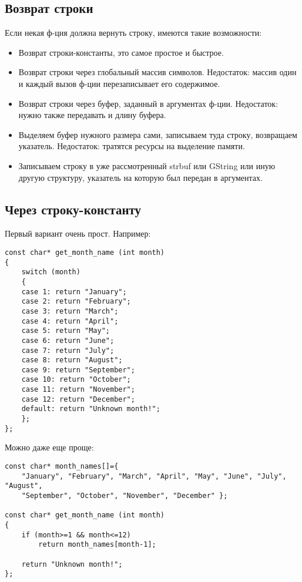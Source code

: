 ﻿\subsection{Возврат строки}

Если некая ф-ция должна вернуть строку, имеются такие возможности:

\begin{itemize}
\item
Возврат строки-константы, это самое простое и быстрое.

\item
Возврат строки через глобальный массив символов. Недостаток: массив один и каждый вызов ф-ции перезаписывает
его содержимое.

\item
Возврат строки через буфер, заданный в аргументах ф-ции. Недостаток: нужно также передавать и длину буфера.

\item
Выделяем буфер нужного размера сами, записываем туда строку, возвращаем указатель. Недостаток: тратятся ресурсы
на выделение памяти.

\item
Записываем строку в уже рассмотренный strbuf или GString или иную другую структуру, указатель на которую был
передан в аргументах.

\end{itemize}

\subsection{Через строку-константу}

Первый вариант очень прост. Например:

\begin{lstlisting}
const char* get_month_name (int month)
{
	switch (month)
	{
	case 1: return "January";
	case 2: return "February";
	case 3: return "March";
	case 4: return "April";
	case 5: return "May";
	case 6: return "June";
	case 7: return "July";
	case 8: return "August";
	case 9: return "September";
	case 10: return "October";
	case 11: return "November";
	case 12: return "December";
	default: return "Unknown month!";
	};
};
\end{lstlisting}

Можно даже еще проще:

\begin{lstlisting}
const char* month_names[]={
	"January", "February", "March", "April", "May", "June", "July", "August",
	"September", "October", "November", "December" };

const char* get_month_name (int month)
{
	if (month>=1 && month<=12)
		return month_names[month-1];

	return "Unknown month!";
};
\end{lstlisting}

